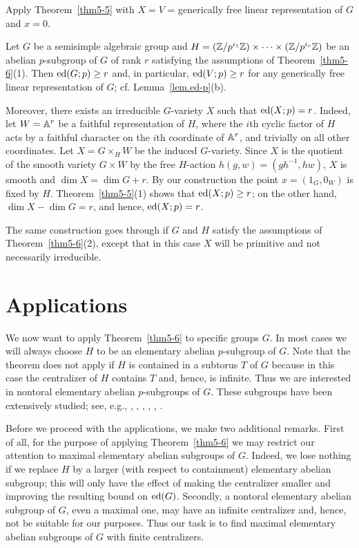 \begin{pf} Apply Theorem~\ref{thm5-5} with $X = V$ = generically free
linear representation of $G$ and $x = 0$.
\end{pf}

\begin{remark} \label{rem.ed=r} Let $G$ be a semisimple algebraic group
and $H = ({\Bbb Z}/p^{i_1}{\Bbb Z}) \times \dots \times ({\Bbb Z}/p^{i_r}{\Bbb Z})$
be an abelian $p$-subgroup of $G$ of rank $r$ satisfying the assumptions
of Theorem~\ref{thm5-6}(1). Then $\operatorname{ed}(G; p) \geq r$ and, in particular,
$\operatorname{ed}(V; p) \geq r$ for any generically free linear representation of $G$; cf. 
Lemma~\ref{lem.ed-p}(b).

Moreover, there exists an irreducible $G$-variety $X$ such that
$\operatorname{ed}(X; p) = r$. Indeed, let $W = {\Bbb A}^r$ be a faithful
representation of $H$, where the $i$th cyclic factor of $H$ acts
by a faithful character on the $i$th coordinate of ${\Bbb A}^r$, and trivially on
all other coordinates.  Let $X = G \times_H W$ be 
the induced $G$-variety. Since
$X$ is the quotient of the smooth variety $G \times W$ by the free $H$-action
$h(g, w) = (gh^{-1}, hw)$, $X$ is smooth and $\dim X=\dim G+r$.
By our construction the point $x = (1_G, 0_W)$ is fixed by $H$.
Theorem~\ref{thm5-5}(1) shows
that $\operatorname{ed}(X; p) \geq r$; on the other hand, $\dim X-\dim G=r$, and hence,
$\operatorname{ed}(X; p)=r$.

The same construction goes through if $G$ and $H$ satisfy the assumptions
of Theorem~\ref{thm5-6}(2), except that in this case $X$ will be primitive
and not necessarily irreducible.
\end{remark}


\section{Applications}
\label{sect8}

We now want to apply Theorem~\ref{thm5-6} to specific groups $G$.
In most cases we will always choose $H$ to be an elementary abelian 
$p$-subgroup of $G$.
Note that the theorem does not apply if $H$ is contained in a subtorus $T$
of $G$ because in this case the centralizer of $H$ contains $T$ and, hence, is
infinite. Thus we are interested in nontoral elementary abelian 
$p$-subgroups of $G$. These subgroups have been extensively studied; 
see, e.g., \cite{adams}, \cite{borel}, \cite{bs},
\cite{cs}, \cite{griess}, \cite{wood}.

Before we proceed with the applications, we make two additional remarks.
First of all, for the purpose of applying Theorem~\ref{thm5-6} 
we may restrict our attention to maximal elementary abelian subgroups 
of $G$. Indeed, we lose nothing if we replace $H$ by a larger (with respect 
to containment) elementary abelian subgroup; this will only have
the effect of making the centralizer smaller and improving
the resulting bound on $\operatorname{ed}(G)$.
Secondly, a nontoral elementary abelian subgroup of $G$, even 
a maximal one, may have an infinite centralizer and, hence, not be suitable
for our purposes. Thus our task is to find maximal elementary abelian 
subgroups of $G$ with finite centralizers.

